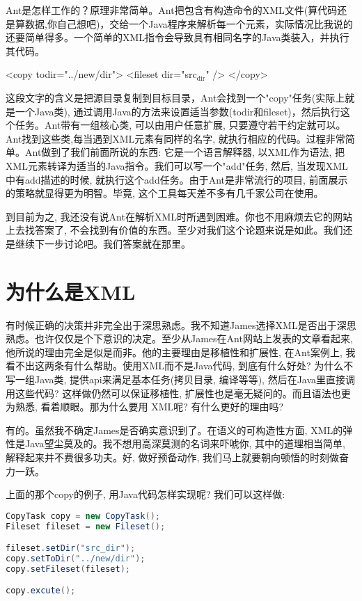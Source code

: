 \documentclass[10pt]{article}
\begin{document}
Ant是怎样工作的？原理非常简单。Ant把包含有构造命令的XML文件(算代码还是算数据,你自己想吧)，交给一个Java程序来解析每一个元素，实际情况比我说的还要简单得多。一个简单的XML指令会导致具有相同名字的Java类装入，并执行其代码。

<copy todir="../new/dir">
    <fileset dir="src$_{\text{dir}}$" />
</copy>

这段文字的含义是把源目录复制到目标目录，Ant会找到一个"copy"任务(实际上就是一个Java类), 通过调用Java的方法来设置适当参数(todir和fileset)，然后执行这个任务。Ant带有一组核心类, 可以由用户任意扩展, 只要遵守若干约定就可以。Ant找到这些类,每当遇到XML元素有同样的名字, 就执行相应的代码。过程非常简单。Ant做到了我们前面所说的东西: 它是一个语言解释器, 以XML作为语法, 把XML元素转译为适当的Java指令。我们可以写一个"add"任务, 然后, 当发现XML中有add描述的时候, 就执行这个add任务。由于Ant是非常流行的项目, 前面展示的策略就显得更为明智。毕竟, 这个工具每天差不多有几千家公司在使用。

到目前为之, 我还没有说Ant在解析XML时所遇到困难。你也不用麻烦去它的网站上去找答案了, 不会找到有价值的东西。至少对我们这个论题来说是如此。我们还是继续下一步讨论吧。我们答案就在那里。
\section{为什么是XML}
\label{sec-3}

有时候正确的决策并非完全出于深思熟虑。我不知道James选择XML是否出于深思熟虑。也许仅仅是个下意识的决定。至少从James在Ant网站上发表的文章看起来, 他所说的理由完全是似是而非。他的主要理由是移植性和扩展性, 在Ant案例上, 我看不出这两条有什么帮助。使用XML而不是Java代码, 到底有什么好处? 为什么不写一组Java类, 提供api来满足基本任务(拷贝目录, 编译等等), 然后在Java里直接调用这些代码? 这样做仍然可以保证移植性, 扩展性也是毫无疑问的。而且语法也更为熟悉, 看着顺眼。那为什么要用 XML呢? 有什么更好的理由吗?

有的。虽然我不确定James是否确实意识到了。在语义的可构造性方面, XML的弹性是Java望尘莫及的。我不想用高深莫测的名词来吓唬你, 其中的道理相当简单, 解释起来并不费很多功夫。好, 做好预备动作, 我们马上就要朝向顿悟的时刻做奋力一跃。

上面的那个copy的例子, 用Java代码怎样实现呢? 我们可以这样做:
\begin{lstlisting}[language=java]
CopyTask copy = new CopyTask();
Fileset fileset = new Fileset();

fileset.setDir("src_dir");
copy.setToDir("../new/dir");
copy.setFileset(fileset);

copy.excute();
\end{lstlisting}
\end{document}
